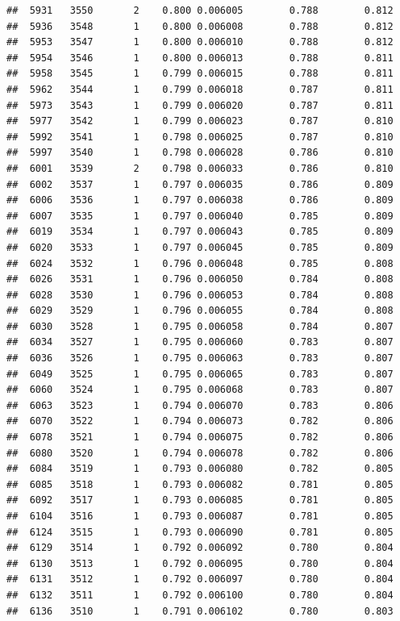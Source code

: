 \documentclass[
]{book}
\begin{document}
\begin{verbatim}
##  5931   3550       2    0.800 0.006005        0.788        0.812
##  5936   3548       1    0.800 0.006008        0.788        0.812
##  5953   3547       1    0.800 0.006010        0.788        0.812
##  5954   3546       1    0.800 0.006013        0.788        0.811
##  5958   3545       1    0.799 0.006015        0.788        0.811
##  5962   3544       1    0.799 0.006018        0.787        0.811
##  5973   3543       1    0.799 0.006020        0.787        0.811
##  5977   3542       1    0.799 0.006023        0.787        0.810
##  5992   3541       1    0.798 0.006025        0.787        0.810
##  5997   3540       1    0.798 0.006028        0.786        0.810
##  6001   3539       2    0.798 0.006033        0.786        0.810
##  6002   3537       1    0.797 0.006035        0.786        0.809
##  6006   3536       1    0.797 0.006038        0.786        0.809
##  6007   3535       1    0.797 0.006040        0.785        0.809
##  6019   3534       1    0.797 0.006043        0.785        0.809
##  6020   3533       1    0.797 0.006045        0.785        0.809
##  6024   3532       1    0.796 0.006048        0.785        0.808
##  6026   3531       1    0.796 0.006050        0.784        0.808
##  6028   3530       1    0.796 0.006053        0.784        0.808
##  6029   3529       1    0.796 0.006055        0.784        0.808
##  6030   3528       1    0.795 0.006058        0.784        0.807
##  6034   3527       1    0.795 0.006060        0.783        0.807
##  6036   3526       1    0.795 0.006063        0.783        0.807
##  6049   3525       1    0.795 0.006065        0.783        0.807
##  6060   3524       1    0.795 0.006068        0.783        0.807
##  6063   3523       1    0.794 0.006070        0.783        0.806
##  6070   3522       1    0.794 0.006073        0.782        0.806
##  6078   3521       1    0.794 0.006075        0.782        0.806
##  6080   3520       1    0.794 0.006078        0.782        0.806
##  6084   3519       1    0.793 0.006080        0.782        0.805
##  6085   3518       1    0.793 0.006082        0.781        0.805
##  6092   3517       1    0.793 0.006085        0.781        0.805
##  6104   3516       1    0.793 0.006087        0.781        0.805
##  6124   3515       1    0.793 0.006090        0.781        0.805
##  6129   3514       1    0.792 0.006092        0.780        0.804
##  6130   3513       1    0.792 0.006095        0.780        0.804
##  6131   3512       1    0.792 0.006097        0.780        0.804
##  6132   3511       1    0.792 0.006100        0.780        0.804
##  6136   3510       1    0.791 0.006102        0.780        0.803

\end{verbatim}
\end{document}
